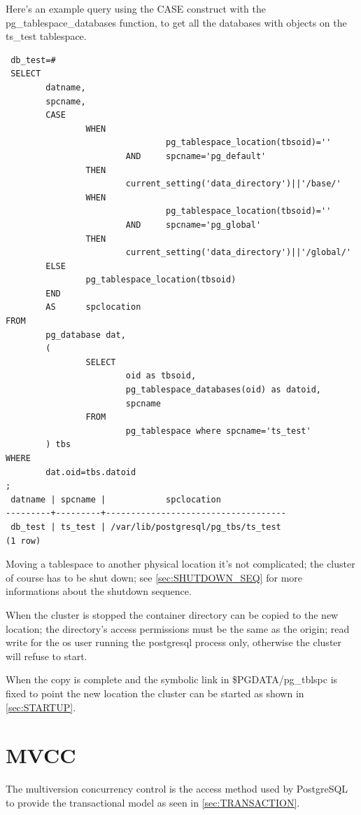 Here's an example query using the CASE construct with the pg\_tablespace\_databases function, to 
get 
all the databases with objects on the ts\_test tablespace.\newpage
\begin{verbatim}
 db_test=# 
 SELECT
        datname,
        spcname,
        CASE
                WHEN 
                                pg_tablespace_location(tbsoid)=''
                        AND     spcname='pg_default'
                THEN
                        current_setting('data_directory')||'/base/'
                WHEN 
                                pg_tablespace_location(tbsoid)=''
                        AND     spcname='pg_global'
                THEN
                        current_setting('data_directory')||'/global/'
        ELSE
                pg_tablespace_location(tbsoid)
        END
        AS      spclocation
FROM
        pg_database dat,
        (
                SELECT
                        oid as tbsoid,
                        pg_tablespace_databases(oid) as datoid,
                        spcname 
                FROM 
                        pg_tablespace where spcname='ts_test'
        ) tbs
WHERE
        dat.oid=tbs.datoid
;
 datname | spcname |            spclocation             
---------+---------+------------------------------------
 db_test | ts_test | /var/lib/postgresql/pg_tbs/ts_test
(1 row)

\end{verbatim}

Moving a tablespace to another physical location it's not complicated; the cluster of course has to 
be shut down; see \ref{sec:SHUTDOWN_SEQ} for more informations about the shutdown sequence.\newline

When the cluster is stopped the container directory can be copied to the new location; the 
directory's access permissions must be the same as the origin; read write for the os user running 
the postgresql process only, otherwise the cluster will refuse to start.\newline

When the copy is complete and the symbolic link in \$PGDATA/pg\_tblspc is fixed to point the new 
location the cluster can be started as shown in \ref{sec:STARTUP}.

\section{MVCC} \label{sec:MVCC} 
The multiversion concurrency control is the access method used by PostgreSQL to provide the 
transactional model as seen in \ref{sec:TRANSACTION}.\newline

